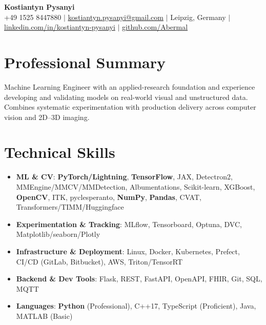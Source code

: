 \documentclass[letterpaper,10pt]{article}
\newcommand{\resumeItem}[1]{
    \item\small{#1}\vspace{-0.5pt}
}
\newcommand{\resumeSubHeadingList}{\begin{itemize}[leftmargin=0.15in, label={}]\vspace{-2pt}}
\newcommand{\resumeSubHeadingListEnd}{\end{itemize}}
\begin{document}
\begin{center}
  \textbf{\Huge Kostiantyn Pysanyi}\vspace{4pt} \\
  \small +49 1525 8447880 $|$ \href{mailto:kostiantyn.pysanyi@gmail.com}{kostiantyn.pysanyi@gmail.com} $|$ Leipzig, Germany $|$
  \href{https://www.linkedin.com/in/kostiantyn-pysanyi/}{linkedin.com/in/kostiantyn-pysanyi} $|$ \href{https://github.com/Abermal}{github.com/Abermal}
\end{center}

\section{Professional Summary}
Machine Learning Engineer with an applied-research foundation and experience developing and validating models on real-world visual and unstructured data. Combines systematic experimentation with production delivery across computer vision and 2D--3D imaging.

\section{Technical Skills}
\resumeSubHeadingList
  \resumeItem{\textbf{ML \& CV}: \textbf{PyTorch/Lightning}, \textbf{TensorFlow}, JAX, Detectron2, MMEngine/MMCV/MMDetection, Albumentations, Scikit-learn, XGBoost, \textbf{OpenCV}, ITK, pyclesperanto, \textbf{NumPy}, \textbf{Pandas}, CVAT, Transformers/TIMM/Huggingface}
  \resumeItem{\textbf{Experimentation \& Tracking}: MLflow, Tensorboard, Optuna, DVC, Matplotlib/seaborn/Plotly}
  \resumeItem{\textbf{Infrastructure \& Deployment}: Linux, Docker, Kubernetes, Prefect, CI/CD (GitLab, Bitbucket), AWS, Triton/TensorRT}
  \resumeItem{\textbf{Backend \& Dev Tools}: Flask, REST, FastAPI, OpenAPI, FHIR, Git, SQL, MQTT}
  \resumeItem{\textbf{Languages}: \textbf{Python} (Professional), C++17, TypeScript (Proficient), Java, MATLAB (Basic)}
\resumeSubHeadingListEnd
\end{document}
